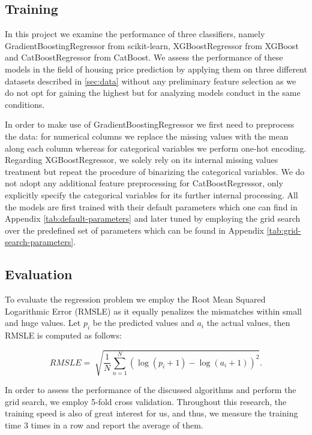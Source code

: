 \subsection{Training}

In this project we examine the performance of three classifiers, namely GradientBoostingRegressor from scikit-learn, XGBoostRegressor from XGBoost and CatBoostRegressor from CatBoost. We assess the performance of these models in the field of housing price prediction by applying them on three different datasets described in \cref{sec:data} without any preliminary feature selection as we do not opt for gaining the highest but for analyzing models conduct in the same conditions.

In order to make use of GradientBoostingRegressor we first need to preprocess the data: for numerical columns we replace the missing values with the mean along each column whereas for categorical variables we perform one-hot encoding. Regarding XGBoostRegressor, we solely rely on its internal missing values treatment but repeat the procedure of binarizing the categorical variables. We do not adopt any additional feature preprocessing for CatBoostRegressor, only explicitly specify the categorical variables for its further internal processing. All the models are first trained with their default parameters which one can find in Appendix \cref{tab:default-parameters} and later tuned by employing the grid search over the predefined set of parameters which can be found in Appendix \cref{tab:grid-search-parameters}.

\subsection{Evaluation}

To evaluate the regression problem we employ the Root Mean Squared Logarithmic Error (RMSLE) as it equally penalizes the mismatches within small and huge values. Let $p_i$ be the predicted values and $a_i$ the actual values, then RMSLE is computed as follows:

$$ RMSLE = \sqrt[]{\frac{1}{N}\sum_{n = 1}^N (\log(p_i + 1) - \log(a_i + 1))^2}. $$

In order to assess the performance of the discussed algorithms and perform the grid search, we employ 5-fold cross validation. Throughout this research, the training speed is also of great interest for us, and thus, we measure the training time 3 times in a row and report the average of them.



